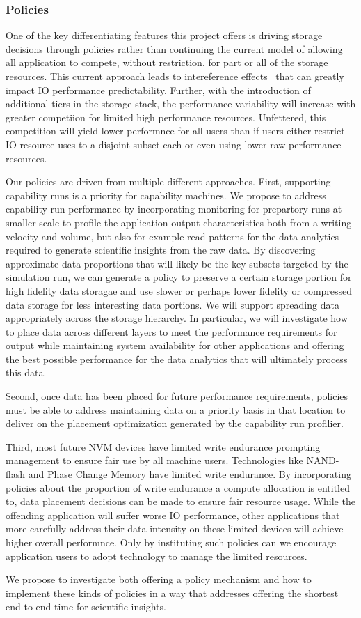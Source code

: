 \subsubsection{Policies}

One of the key differentiating features this project offers is driving storage
decisions through policies rather than continuing the current model of allowing
all application to compete, without restriction, for part or all of the storage
resources. This current approach leads to intereference
effects~\cite{lofstead:2010:adaptive} that can greatly impact IO performance
predictability. Further, with the introduction of additional tiers in the
storage stack, the performance variability will increase with greater
competiion for limited high performance resources. Unfettered, this competition
will yield lower performnce for all users than if users either restrict IO
resource uses to a disjoint subset each or even using lower raw performance
resources.

Our policies are driven from multiple different approaches. First, supporting
capability runs is a priority for capability machines. We propose to address
capability run performance by incorporating monitoring for prepartory runs at
smaller scale to profile the application output characteristics both from a
writing velocity and volume, but also for example read patterns for the data
analytics required to generate scientific insights from the raw data. By
discovering approximate data proportions that will likely be the key subsets
targeted by the simulation run, we can generate a policy to preserve a certain
storage portion for high fidelity data storagae and use slower or perhaps lower
fidelity or compressed data storage for less interesting data portions. We will
support spreading data appropriately across the storage hierarchy. In
particular, we will investigate how to place data across different layers to
meet the performance requirements for output while maintaining system
availability for other applications and offering the best possible performance
for the data analytics that will ultimately process this data.

Second, once data has been placed for future performance requirements, policies
must be able to address maintaining data on a priority basis in that location
to deliver on the placement optimization generated by the capability run
profilier.

Third, most future NVM devices have limited write endurance prompting
management to ensure fair use by all machine users. Technologies like
NAND-flash and Phase Change Memory have limited write endurance. By
incorporating policies about the proportion of write endurance a compute
allocation is entitled to, data placement decisions can be made to ensure fair
resource usage. While the offending application will suffer worse IO
performance, other applications that more carefully address their data
intensity on these limited devices will achieve higher overall performnce. Only
by instituting such policies can we encourage application users to adopt
technology to manage the limited resources.

We propose to investigate both offering a policy mechanism and how to implement
these kinds of policies in a way that addresses offering the shortest
end-to-end time for scientific insights.

